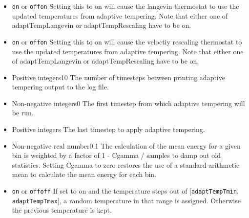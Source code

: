 \begin{itemize}
\item
{}
{{\tt on} or {\tt off}}{{\tt on}}
{Setting this to on will cause the langevin thermostat to use the updated temperatures from adaptive tempering. Note that either one of adaptTempLangevin or adaptTempRescaling have to be on.
}

\item
{}
{{\tt on} or {\tt off}}{{\tt on}}
{Setting this to on will cause the veloctiy rescaling thermostat to use the updated temperatures from adaptive tempering.  Note that either one of adaptTempLangevin or adaptTempRescaling have to be on.
}

\item
{}
{Positive integers}{10}
{The number of timesteps between printing adaptive tempering output to the log file.
}

\item
{}
{Non-negative integers}{0}
{The first timestep from which adaptive tempering will be run.}

\item
{}
{Positive integers}
{The last timestep to apply adaptive tempering.}

\item
{}
{Non-negative real number}{0.1}
{The calculation of the mean energy for a given bin is weighted by a factor of 1 - Cgamma / samples to damp out old statistics. Setting Cgamma to zero restores the use of a standard arithmetic mean to calculate the mean energy for each bin.}

\item
{}
{{\tt on} or {\tt off}}{{\tt off}}
{If set to on and the temperature steps out of [{\tt adaptTempTmin}, {\tt adaptTempTmax}], a random temperature in that range is assigned. Otherwise the previous temperature is kept.
}


\end{itemize}


